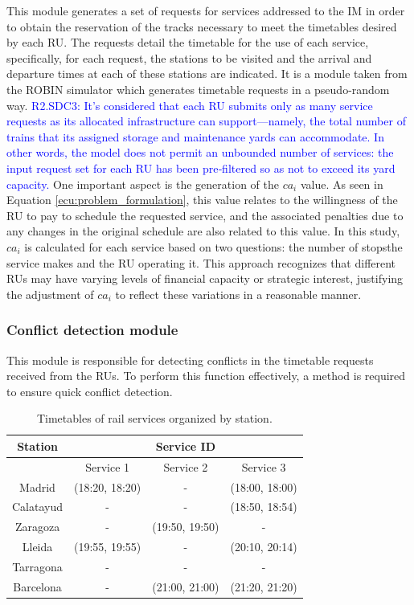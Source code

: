 \documentclass[Afour,sagev,times]{sagej}
\newcommand{\segundo}[1]{\textcolor{blue}{#1}}
\begin{document}
This module generates a set of requests for services addressed to the \gls{IM} in order to obtain the reservation of the tracks necessary to meet the timetables desired by each \gls{RU}. The requests detail the timetable for the use of each service, specifically, for each request, the stations to be visited and the arrival and departure times at each of these stations are indicated. It is a module taken from the ROBIN \cite{delCastillo24} simulator which generates timetable requests in a pseudo-random way. \segundo{R2.SDC3: It's considered that each \gls{RU} submits only as many service requests as its allocated infrastructure can support—namely, the total number of trains that its assigned storage and maintenance yards can accommodate. In other words, the model does not permit an unbounded number of services: the input request set for each \gls{RU} has been pre‐filtered so as not to exceed its yard capacity.} One important aspect is the generation of the $ ca_i $ value. As seen in Equation \ref{ecu:problem_formulation}, this value relates to the willingness of the \gls{RU} to pay to schedule the requested service, and the associated penalties due to any changes in the original schedule are also related to this value. In this study, $ ca_i $ is calculated for each service based on two questions: the number of stopsthe service makes and the \gls{RU} operating it. This approach recognizes that different \glspl{RU} may have varying levels of financial capacity or strategic interest, justifying the adjustment of $ ca_i $ to reflect these variations in a reasonable manner.

\subsubsection{Conflict detection module}
\label{sec:conflict_detection_module}

This module is responsible for detecting conflicts in the timetable requests received from the \glspl{RU}. To perform this function effectively, a method is required to ensure quick conflict detection. 

\begin{table}[ht]
\centering
\caption{Timetables of rail services organized by station.}
\begin{tabular}{@{}cccc@{}}
\toprule
Station   & \multicolumn{3}{c}{Service ID} \\ \midrule
           & Service 1 & Service 2  & Service 3 \\ \midrule
Madrid     & (18:20, 18:20) &      -       & (18:00, 18:00)  \\
Calatayud  &       -       &      -       & (18:50, 18:54)  \\
Zaragoza   &       -       & (19:50, 19:50) &       -        \\
Lleida     & (19:55, 19:55) &       -      & (20:10, 20:14)  \\
Tarragona  &       -       &      -       &       -        \\
Barcelona  &       -       & (21:00, 21:00) & (21:20, 21:20)  \\ \bottomrule
\end{tabular}
\label{tab:servicios_ferroviarios}
\end{table}
\end{document}
